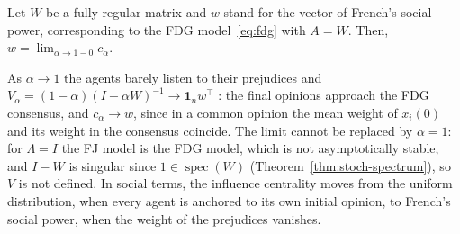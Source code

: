 \begin{lemma}
\label{lem:centrality-limit}
Let $W$ be a fully regular matrix and $w$ stand for the vector of French's social
power, corresponding to the FDG model~\eqref{eq:fdg} with $A = W$. Then,
$w = \lim_{\alpha \to 1-0} c_\alpha$.
\end{lemma}

As $\alpha \to 1$ the agents barely listen to their prejudices and
$V_\alpha = (1 - \alpha)(I - \alpha W)^{-1} \to \mathbf{1}_n w^\top$
\cite{proskurnikov2017tutorial}: the final opinions approach the FDG consensus, and
$c_\alpha \to w$, since in a common opinion the mean weight of $x_i(0)$ and its weight
in the consensus coincide. The limit cannot be replaced by $\alpha = 1$: for
$\Lambda = I$ the FJ model is the
FDG model, which is not asymptotically stable, and $I - W$ is singular since
$1 \in \operatorname{spec}(W)$ (Theorem~\ref{thm:stoch-spectrum}), so $V$ is not
defined. In social terms, the influence centrality moves from the uniform
distribution, when every agent is anchored to its own initial opinion, to French's
social power, when the weight of the prejudices vanishes.

